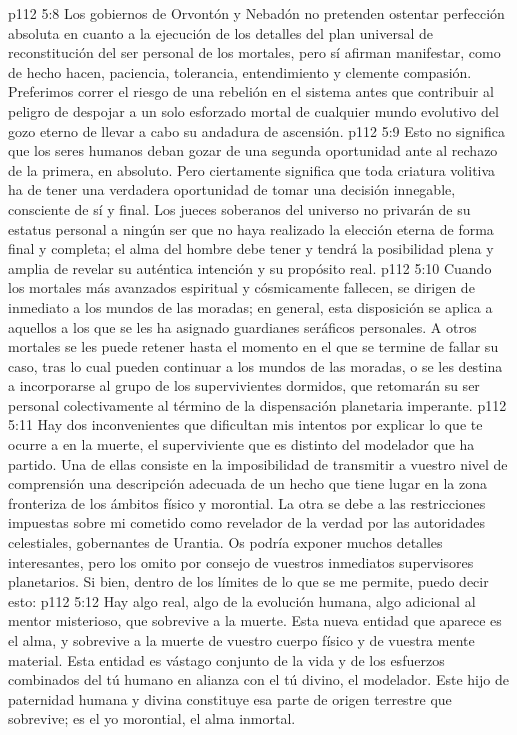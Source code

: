 \vs p112 5:8 Los gobiernos de Orvontón y Nebadón no pretenden ostentar perfección absoluta en cuanto a la ejecución de los detalles del plan universal de reconstitución del ser personal de los mortales, pero sí afirman manifestar, como de hecho hacen, paciencia, tolerancia, entendimiento y clemente compasión. Preferimos correr el riesgo de una rebelión en el sistema antes que contribuir al peligro de despojar a un solo esforzado mortal de cualquier mundo evolutivo del gozo eterno de llevar a cabo su andadura de ascensión.
\vs p112 5:9 Esto no significa que los seres humanos deban gozar de una segunda oportunidad ante al rechazo de la primera, en absoluto. Pero ciertamente significa que toda criatura volitiva ha de tener una verdadera oportunidad de tomar una decisión innegable, consciente de sí y final. Los jueces soberanos del universo no privarán de su estatus personal a ningún ser que no haya realizado la elección eterna de forma final y completa; el alma del hombre debe tener y tendrá la posibilidad plena y amplia de revelar su auténtica intención y su propósito real.
\vs p112 5:10 Cuando los mortales más avanzados espiritual y cósmicamente fallecen, se dirigen de inmediato a los mundos de las moradas; en general, esta disposición se aplica a aquellos a los que se les ha asignado guardianes seráficos personales. A otros mortales se les puede retener hasta el momento en el que se termine de fallar su caso, tras lo cual pueden continuar a los mundos de las moradas, o se les destina a incorporarse al grupo de los supervivientes dormidos, que retomarán su ser personal colectivamente al término de la dispensación planetaria imperante.
\vs p112 5:11 \pc Hay dos inconvenientes que dificultan mis intentos por explicar lo que te ocurre a  en la muerte, el  superviviente que es distinto del modelador que ha partido. Una de ellas consiste en la imposibilidad de transmitir a vuestro nivel de comprensión una descripción adecuada de un hecho que tiene lugar en la zona fronteriza de los ámbitos físico y morontial. La otra se debe a las restricciones impuestas sobre mi cometido como revelador de la verdad por las autoridades celestiales, gobernantes de Urantia. Os podría exponer muchos detalles interesantes, pero los omito por consejo de vuestros inmediatos supervisores planetarios. Si bien, dentro de los límites de lo que se me permite, puedo decir esto:
\vs p112 5:12 Hay algo real, algo de la evolución humana, algo adicional al mentor misterioso, que sobrevive a la muerte. Esta nueva entidad que aparece es el alma, y sobrevive a la muerte de vuestro cuerpo físico y de vuestra mente material. Esta entidad es vástago conjunto de la vida y de los esfuerzos combinados del tú humano en alianza con el tú divino, el modelador. Este hijo de paternidad humana y divina constituye esa parte de origen terrestre que sobrevive; es el yo morontial, el alma inmortal.
